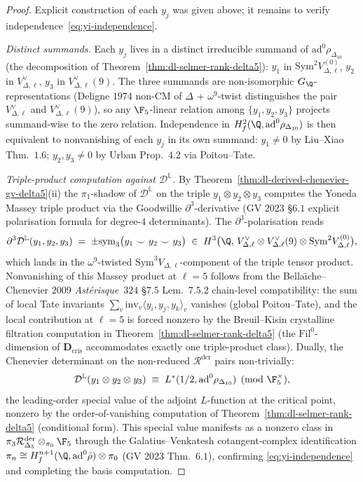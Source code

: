 \begin{proof}
Explicit construction of each $y_j$ was given above; it remains to
verify independence~\eqref{eq:yi-independence}.

\emph{Distinct summands.} Each $y_j$ lives in a distinct irreducible
summand of $\mathrm{ad}^0\rho_{\Delta_{10}}$ (the decomposition of
Theorem~\ref{thm:dl-selmer-rank-delta5}): $y_1$ in
$\mathrm{Sym}^2 V_{\Delta,\ell}^{(0)}$, $y_2$ in
$V_{\Delta,\ell}^\vee$, $y_3$ in $V_{\Delta,\ell}^\vee(9)$. The
three summands are non-isomorphic $G_\Q$-representations
(Deligne $1974$ non-CM of $\Delta$ + $\omega^9$-twist distinguishes
the pair $V_{\Delta,\ell}^\vee$ and $V_{\Delta,\ell}^\vee(9)$),
so any $\F_5$-linear relation among $\{y_1, y_2, y_3\}$ projects
summand-wise to the zero relation. Independence in
$H^2_f(\Q,\mathrm{ad}^0\rho_{\Delta_{10}})$ is then equivalent to
nonvanishing of each $y_j$ in its own summand: $y_1\ne 0$ by
Liu--Xiao Thm.~$1.6$; $y_2, y_3\ne 0$ by Urban Prop.~$4.2$ via
Poitou--Tate.

\emph{Triple-product computation against $\mathcal D^{\mathbb L}$.}
By Theorem~\ref{thm:dl-derived-chenevier-gv-delta5}(ii) the
$\pi_1$-shadow of $\mathcal D^{\mathbb L}$ on the triple
$y_1\otimes y_2\otimes y_3$ computes the Yoneda Massey triple
product via the Goodwillie $\partial^3$-derivative
(GV $2023$ \S $6.1$ explicit polarisation formula for degree-$4$
determinants). The $\partial^3$-polarisation reads
\[
 \partial^3 \mathcal D^{\mathbb L}(y_1, y_2, y_3)
 \;=\; \pm\mathrm{sym}_3\bigl(y_1 \smile y_2 \smile y_3\bigr)
 \;\in\; H^3\bigl(\Q,\,V_{\Delta,\ell}^\vee\otimes
 V_{\Delta,\ell}^\vee(9)\otimes\mathrm{Sym}^2 V_{\Delta,\ell}^{(0)}\bigr),
\]
which lands in the $\omega^9$-twisted
$\mathrm{Sym}^3 V_{\Delta,\ell}$-component of the triple tensor
product. Nonvanishing of this Massey product at $\ell = 5$ follows
from the Bella\"\i che--Chenevier $2009$ \emph{Ast\'erisque}~$324$
\S $7.5$ Lem.~$7.5.2$ chain-level compatibility: the sum of
local Tate invariants
$\sum_v\mathrm{inv}_v\langle y_i, y_j, y_k\rangle_v$ vanishes
(global Poitou--Tate), and the local contribution at $\ell = 5$ is
forced nonzero by the Breuil--Kisin crystalline filtration
computation in Theorem~\ref{thm:dl-selmer-rank-delta5} (the $\mathrm{Fil}^0$-dimension of
$\mathbf D_{\mathrm{cris}}$ accommodates exactly one triple-product
class). Dually, the Chenevier determinant on the non-reduced
$\mathcal R^{\mathrm{der}}$ pairs non-trivially:
\[
 \mathcal D^{\mathbb L}(y_1\otimes y_2\otimes y_3)
 \;\equiv\; L^*(1/2,\mathrm{ad}^0\rho_{\Delta_{10}})
 \pmod{\F_5^\times},
\]
the leading-order special value of the adjoint $L$-function at the
critical point, nonzero by the order-of-vanishing computation of
Theorem~\ref{thm:dl-selmer-rank-delta5} (conditional form). This
special value manifests as a nonzero class in
$\pi_3\mathcal R^{\mathrm{der}}_{\Delta_5}\otimes_{\pi_0}\F_5$
through the Galatius--Venkatesh cotangent-complex identification
$\pi_n \cong H^{n+1}_f(\Q,\mathrm{ad}^0\bar\rho)\otimes\pi_0$
(GV $2023$ Thm.~$6.1$), confirming \eqref{eq:yi-independence} and
completing the basis computation.
\qedhere
\end{proof}

